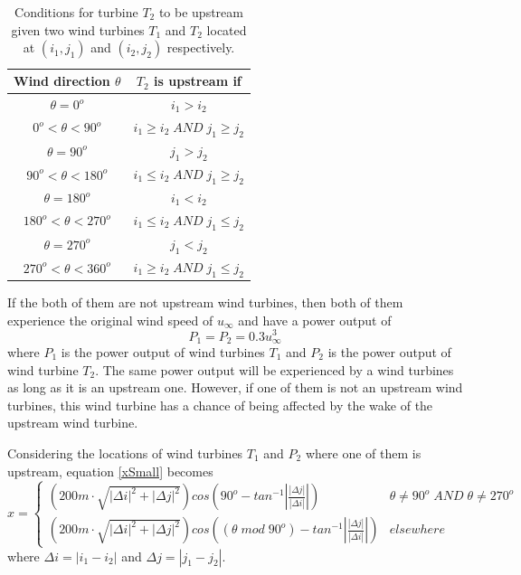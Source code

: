    \begin{table}[h]
        \centering
        \begin{tabular}{|c|c|} \hline
            Wind direction $\theta$ & $T_2$ is upstream if \\ \hline
            $\theta = 0^o$ & $i_1>i_2$ \\ \hline
            $0^o<\theta<90^o$ & $i_1 \geq i_2 \;AND\; j_1 \geq j_2$ \\ \hline
            $\theta = 90^o$ & $j_1>j_2$ \\ \hline
            $90^o<\theta<180^o$ & $i_1 \leq i_2 \;AND\; j_1 \geq j_2$ \\ \hline
            $\theta = 180^o$ & $i_1<i_2$ \\ \hline
            $180^o<\theta<270^o$ & $i_1 \leq i_2 \;AND\; j_1 \leq j_2$ \\ \hline
            $\theta = 270^o$ & $j_1<j_2$ \\ \hline
            $270^o<\theta<360^o$ & $i_1 \geq i_2 \;AND\; j_1 \leq j_2$ \\ \hline
        \end{tabular}
        \caption{Conditions for turbine $T_2$ to be upstream given two wind turbines $T_1$ and $T_2$ located at $(i_1,j_1)$ and $(i_2,j_2)$ respectively.}
        \label{coverage2}
    \end{table}
    
    If the both of them are not upstream wind turbines, then both of them experience the original wind speed of $u_\infty$ and have a power output of
    \begin{equation}
        P_1=P_2=0.3u_\infty^3
    \end{equation}
    where $P_1$ is the power output of wind turbines $T_1$ and $P_2$ is the power output of wind turbine $T_2$. The same power output will be experienced by a wind turbines as long as it is an upstream one. However, if one of them is not an upstream wind turbines, this wind turbine has a chance of being affected by the wake of the upstream wind turbine.
    
    Considering the locations of wind turbines $T_1$ and $P_2$ where one of them is upstream, equation \ref{xSmall} becomes
    \begin{equation} \label{xSmall}
        x =
        \begin{cases} 
            \left(200m\cdot\sqrt{\left| \Delta i \right|^2+\left| \Delta j \right|^2}\right)cos\left(90^o-tan^{-1}\left| \frac{\left| \Delta j \right|}{\left| \Delta i \right|} \right| \right) & \theta \neq 90^o \;AND\; \theta \neq 270^o \\
            \left(200m\cdot\sqrt{\left| \Delta i \right|^2+\left| \Delta j \right|^2}\right)cos\left( \left( \theta \;mod\; 90^o \right)-tan^{-1}\left| \frac{\left| \Delta j \right|}{\left| \Delta i \right|} \right| \right) & elsewhere
        \end{cases}
    \end{equation}
    where $\Delta i=|i_1-i_2|$ and $\Delta j=|j_1-j_2|$.
    
